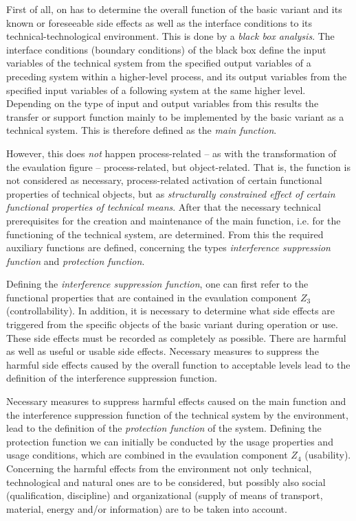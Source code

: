\documentclass[11pt,a4paper]{article}
\begin{document}
First of all, on has to determine the overall function of the basic variant
and its known or foreseeable side effects as well as the interface conditions
to its technical-technological environment. This is done by a \emph{black box
  analysis}.  The interface conditions (boundary conditions) of the black box
define the input variables of the technical system from the specified output
variables of a preceding system within a higher-level process, and its output
variables from the specified input variables of a following system at the same
higher level. Depending on the type of input and output variables from this
results the transfer or support function mainly to be implemented by the basic
variant as a technical system. This is therefore defined as the \emph{main
  function}.

However, this does \emph{not} happen process-related -- as with the
transformation of the evaulation figure -- process-related, but object-related.
That is, the function is not considered as necessary, process-related
activation of certain functional properties of technical objects, but as
\emph{structurally constrained effect of certain functional properties of
  technical means}. After that the necessary technical prerequisites for the
creation and maintenance of the main function, i.e. for the functioning of the
technical system, are determined. From this the required auxiliary functions
are defined, concerning the types \emph{interference suppression function} and
\emph{protection function}.

Defining the \emph{interference suppression function}, one can first refer to
the functional properties that are contained in the evaulation component $Z_3$
(controllability).  In addition, it is necessary to determine what side
effects are triggered from the specific objects of the basic variant during
operation or use. These side effects must be recorded as completely as
possible.  There are harmful as well as useful or usable side effects.
Necessary measures to suppress the harmful side effects caused by the overall
function to acceptable levels lead to the definition of the interference
suppression function.

Necessary measures to suppress harmful effects caused on the main function and
the interference suppression function of the technical system by the
environment, lead to the definition of the \emph{protection function} of the
system. Defining the protection function we can initially be conducted by the
usage properties and usage conditions, which are combined in the evaulation
component $Z_4$ (usability). Concerning the harmful effects from the
environment not only technical, technological and natural ones are to be
considered, but possibly also social (qualification, discipline) and
organizational (supply of means of transport, material, energy and/or
information) are to be taken into account.
\end{document}
